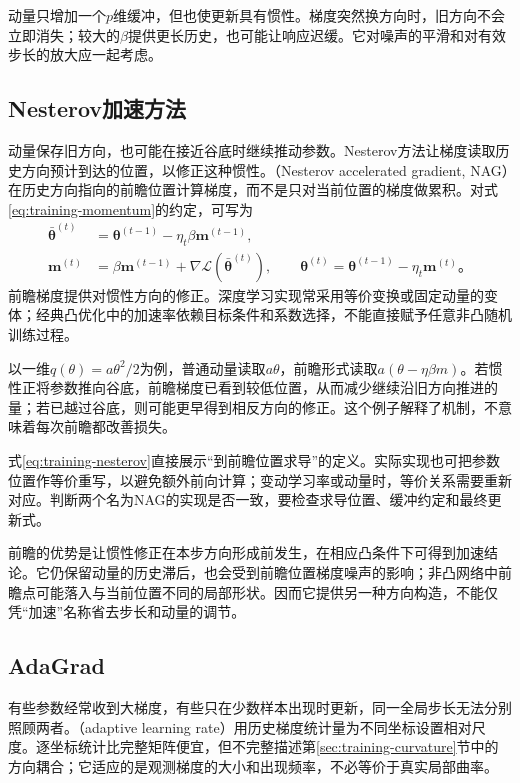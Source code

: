 动量只增加一个$p$维缓冲，但也使更新具有惯性。梯度突然换方向时，旧方向不会立即消失；较大的$\beta$提供更长历史，也可能让响应迟缓。它对噪声的平滑和对有效步长的放大应一起考虑。

\subsection{Nesterov加速方法}
\label{sec:training-nesterov}

动量保存旧方向，也可能在接近谷底时继续推动参数。Nesterov方法让梯度读取历史方向预计到达的位置，以修正这种惯性。（Nesterov accelerated gradient, NAG）在历史方向指向的前瞻位置计算梯度，而不是只对当前位置的梯度做累积。对式\eqref{eq:training-momentum}的约定，可写为
\begin{align}
  \bar{\bm\theta}^{(t)}&=\bm\theta^{(t-1)}-\eta_t\beta\bm m^{(t-1)},\\
  \bm m^{(t)}&=\beta\bm m^{(t-1)}+
       \nabla\mathcal L(\bar{\bm\theta}^{(t)}),\qquad
  \bm\theta^{(t)}=\bm\theta^{(t-1)}-\eta_t\bm m^{(t)}\text{。}
  \label{eq:training-nesterov}
\end{align}
前瞻梯度提供对惯性方向的修正。深度学习实现常采用等价变换或固定动量的变体；经典凸优化中的加速率依赖目标条件和系数选择，不能直接赋予任意非凸随机训练过程。

以一维$q(\theta)=a\theta^2/2$为例，普通动量读取$a\theta$，前瞻形式读取$a(\theta-\eta\beta m)$。若惯性正将参数推向谷底，前瞻梯度已看到较低位置，从而减少继续沿旧方向推进的量；若已越过谷底，则可能更早得到相反方向的修正。这个例子解释了机制，不意味着每次前瞻都改善损失。

式\eqref{eq:training-nesterov}直接展示“到前瞻位置求导”的定义。实际实现也可把参数位置作等价重写，以避免额外前向计算；变动学习率或动量时，等价关系需要重新对应。判断两个名为NAG的实现是否一致，要检查求导位置、缓冲约定和最终更新式。

前瞻的优势是让惯性修正在本步方向形成前发生，在相应凸条件下可得到加速结论。它仍保留动量的历史滞后，也会受到前瞻位置梯度噪声的影响；非凸网络中前瞻点可能落入与当前位置不同的局部形状。因而它提供另一种方向构造，不能仅凭“加速”名称省去步长和动量的调节。

\subsection{AdaGrad}
\label{sec:training-adaptive}

有些参数经常收到大梯度，有些只在少数样本出现时更新，同一全局步长无法分别照顾两者。（adaptive learning rate）用历史梯度统计量为不同坐标设置相对尺度。逐坐标统计比完整矩阵便宜，但不完整描述第\ref{sec:training-curvature}节中的方向耦合；它适应的是观测梯度的大小和出现频率，不必等价于真实局部曲率。

